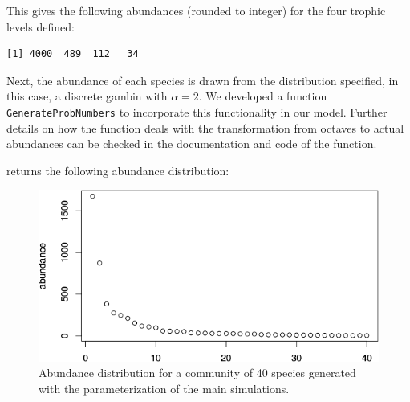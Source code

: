 \normalsize
This gives the following abundances (rounded to integer) for the four trophic levels defined:\\
\small

\begin{verbatim}
[1] 4000  489  112   34
\end{verbatim}

\normalsize

Next, the abundance of each species is drawn from the distribution specified, in this case, a discrete gambin with \(\alpha = 2\). We developed a function \texttt{GenerateProbNumbers} to incorporate this functionality in our model. Further details on how the function deals with the transformation from octaves to actual abundances can be checked in the documentation and code of the function.\\
\small

\begin{Shaded}
\begin{Highlighting}[]
\StringTok{ }\NormalTok{(} 
                                            
                                            
                                            
                                            
\end{Highlighting}
\end{Shaded}

\normalsize
returns the following abundance distribution:\\

\begin{figure}[ht]
\centering
\includegraphics[width=\textwidth]{./Figures/Appendix3_1/Fig_2.png}
\caption[Abundance distribution]{\color{Gray} Abundance distribution for a community of 40 species generated with the parameterization of the main simulations.}
\label{fig:figApp3.1.2}
\end{figure}

